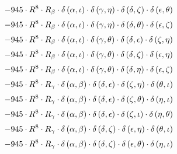 \begin{subequations}
\begin{gather}
 \\[0.2em] \notag 		 - 945 \cdot R^{8} \cdot R_{\beta{}} \cdot \delta{}\left(\alpha{}, \iota{}\right) \cdot \delta{}\left(\gamma{}, \eta{}\right) \cdot \delta{}\left(\delta{}, \zeta{}\right) \cdot \delta{}\left(\epsilon{}, \theta{}\right) 
 \\[0.2em] \notag 		 - 945 \cdot R^{8} \cdot R_{\beta{}} \cdot \delta{}\left(\alpha{}, \iota{}\right) \cdot \delta{}\left(\gamma{}, \eta{}\right) \cdot \delta{}\left(\delta{}, \theta{}\right) \cdot \delta{}\left(\epsilon{}, \zeta{}\right) 
 \\[0.2em] \notag 		 - 945 \cdot R^{8} \cdot R_{\beta{}} \cdot \delta{}\left(\alpha{}, \iota{}\right) \cdot \delta{}\left(\gamma{}, \theta{}\right) \cdot \delta{}\left(\delta{}, \epsilon{}\right) \cdot \delta{}\left(\zeta{}, \eta{}\right) 
 \\[0.2em] \notag 		 - 945 \cdot R^{8} \cdot R_{\beta{}} \cdot \delta{}\left(\alpha{}, \iota{}\right) \cdot \delta{}\left(\gamma{}, \theta{}\right) \cdot \delta{}\left(\delta{}, \zeta{}\right) \cdot \delta{}\left(\epsilon{}, \eta{}\right) 
 \\[0.2em] \notag 		 - 945 \cdot R^{8} \cdot R_{\beta{}} \cdot \delta{}\left(\alpha{}, \iota{}\right) \cdot \delta{}\left(\gamma{}, \theta{}\right) \cdot \delta{}\left(\delta{}, \eta{}\right) \cdot \delta{}\left(\epsilon{}, \zeta{}\right) 
 \\[0.2em] \notag 		 - 945 \cdot R^{8} \cdot R_{\gamma{}} \cdot \delta{}\left(\alpha{}, \beta{}\right) \cdot \delta{}\left(\delta{}, \epsilon{}\right) \cdot \delta{}\left(\zeta{}, \eta{}\right) \cdot \delta{}\left(\theta{}, \iota{}\right) 
 \\[0.2em] \notag 		 - 945 \cdot R^{8} \cdot R_{\gamma{}} \cdot \delta{}\left(\alpha{}, \beta{}\right) \cdot \delta{}\left(\delta{}, \epsilon{}\right) \cdot \delta{}\left(\zeta{}, \theta{}\right) \cdot \delta{}\left(\eta{}, \iota{}\right) 
 \\[0.2em] \notag 		 - 945 \cdot R^{8} \cdot R_{\gamma{}} \cdot \delta{}\left(\alpha{}, \beta{}\right) \cdot \delta{}\left(\delta{}, \epsilon{}\right) \cdot \delta{}\left(\zeta{}, \iota{}\right) \cdot \delta{}\left(\eta{}, \theta{}\right) 
 \\[0.2em] \notag 		 - 945 \cdot R^{8} \cdot R_{\gamma{}} \cdot \delta{}\left(\alpha{}, \beta{}\right) \cdot \delta{}\left(\delta{}, \zeta{}\right) \cdot \delta{}\left(\epsilon{}, \eta{}\right) \cdot \delta{}\left(\theta{}, \iota{}\right) 
 \\[0.2em] \notag 		 - 945 \cdot R^{8} \cdot R_{\gamma{}} \cdot \delta{}\left(\alpha{}, \beta{}\right) \cdot \delta{}\left(\delta{}, \zeta{}\right) \cdot \delta{}\left(\epsilon{}, \theta{}\right) \cdot \delta{}\left(\eta{}, \iota{}\right) 

\end{gather}
\end{subequations}
